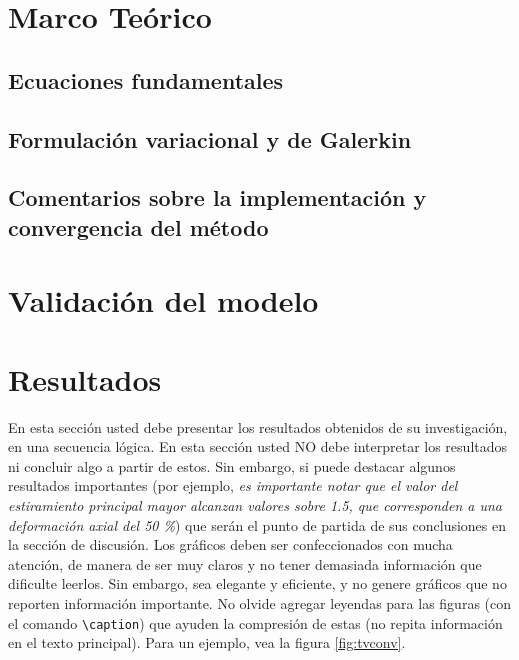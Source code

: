 \documentclass[12pt, letterpaper]{article}
\begin{document}
\section{Marco Te\'orico}
  \subsection{Ecuaciones fundamentales}
  
  \subsection{Formulaci\'on variacional y de Galerkin}
  
  \subsection{Comentarios sobre la implementaci\'on y convergencia del m\'etodo}
\section{Validaci\'on del modelo}
  
\section{Resultados}
  
En esta secci\'on usted debe presentar los resultados obtenidos de su investigaci\'on, en una secuencia l\'ogica. En esta secci\'on usted NO debe interpretar los resultados ni concluir algo a partir de estos. Sin embargo, si puede destacar algunos resultados importantes (por ejemplo, {\it es importante notar que el valor del estiramiento principal mayor alcanzan valores sobre 1.5, que corresponden a una deformaci\'on axial del 50 \%}) que ser\'an el punto de partida de sus conclusiones en la secci\'on de discusi\'on. Los gr\'aficos deben ser confeccionados con mucha atenci\'on, de manera de ser muy claros y no tener demasiada informaci\'on que dificulte leerlos. Sin embargo, sea elegante y eficiente, y no genere gr\'aficos que no reporten informaci\'on importante. No olvide agregar leyendas para las figuras (con el comando {\tt \textbackslash caption}) que ayuden la compresi\'on de estas (no repita informaci\'on en el texto principal). Para un ejemplo, vea la figura \ref{fig:tvconv}.
\end{document}
